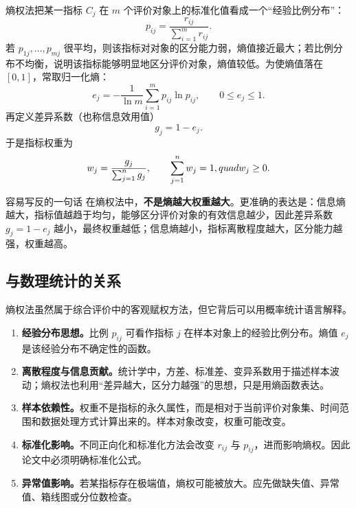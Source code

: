 \documentclass[UTF8,a4paper,12pt]{ctexart}
\begin{document}
熵权法把某一指标 $C_j$ 在 $m$ 个评价对象上的标准化值看成一个“经验比例分布”：
\begin{equation}
 p_{ij}=\frac{r_{ij}}{\sum_{i=1}^{m}r_{ij}}.
\end{equation}
若 $p_{1j},\ldots,p_{mj}$ 很平均，则该指标对对象的区分能力弱，熵值接近最大；若比例分布不均衡，说明该指标能够明显地区分评价对象，熵值较低。为使熵值落在 $[0,1]$，常取归一化熵：
\begin{equation}
 e_j=-\frac{1}{\ln m}\sum_{i=1}^{m}p_{ij}\ln p_{ij},\qquad 0\le e_j\le 1.
\end{equation}
再定义差异系数（也称信息效用值）
\begin{equation}
 g_j=1-e_j.
\end{equation}
于是指标权重为
\begin{equation}
 w_j=\frac{g_j}{\sum_{j=1}^{n}g_j},\qquad \sum_{j=1}^{n}w_j=1,\\quad w_j\ge 0.
\end{equation}

\begin{warnbox}{容易写反的一句话}
在熵权法中，\textbf{不是熵越大权重越大}。更准确的表达是：信息熵越大，指标值越趋于均匀，能够区分评价对象的有效信息越少，因此差异系数 $g_j=1-e_j$ 越小，最终权重越低；信息熵越小，指标离散程度越大，区分能力越强，权重越高。
\end{warnbox}

\subsection{与数理统计的关系}

熵权法虽然属于综合评价中的客观赋权方法，但它背后可以用概率统计语言解释。

\begin{enumerate}
  \item \textbf{经验分布思想。}比例 $p_{ij}$ 可看作指标 $j$ 在样本对象上的经验比例分布。熵值 $e_j$ 是该经验分布不确定性的函数。
  \item \textbf{离散程度与信息贡献。}统计学中，方差、标准差、变异系数用于描述样本波动；熵权法也利用“差异越大，区分力越强”的思想，只是用熵函数表达。
  \item \textbf{样本依赖性。}权重不是指标的永久属性，而是相对于当前评价对象集、时间范围和数据处理方式计算出来的。样本对象改变，权重可能改变。
  \item \textbf{标准化影响。}不同正向化和标准化方法会改变 $r_{ij}$ 与 $p_{ij}$，进而影响熵权。因此论文中必须明确标准化公式。
  \item \textbf{异常值影响。}若某指标存在极端值，熵权可能被放大。应先做缺失值、异常值、箱线图或分位数检查。
\end{enumerate}
\end{document}
